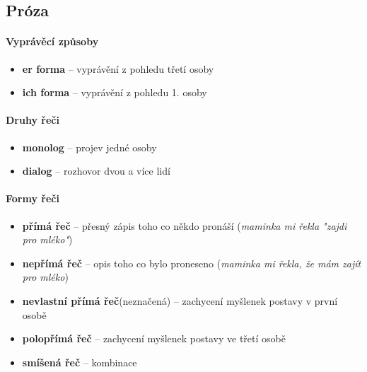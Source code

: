 \documentclass[10pt,a4paper]{article}
\begin{document}
\subsection{Próza}
\paragraph{Vyprávěcí způsoby}
\begin{itemize}
\item[] \textbf{er forma} -- vyprávění z pohledu třetí osoby
\item[] \textbf{ich forma} -- vyprávění z pohledu 1. osoby
\end{itemize}

\paragraph{Druhy řeči}
\begin{itemize}
\item[] \textbf{monolog} -- projev jedné osoby
\item[] \textbf{dialog} -- rozhovor dvou a více lidí
\end{itemize}

\paragraph{Formy řeči}
\begin{itemize}
\item[] \textbf{přímá řeč} -- přesný zápis toho co někdo pronáší (\textit{maminka mi řekla "zajdi pro mléko"})
\item[] \textbf{nepřímá řeč} -- opis toho co bylo proneseno (\textit{maminka mi řekla, že mám zajít pro mléko})
\item[] \textbf{nevlastní přímá řeč}(neznačená) -- zachycení myšlenek postavy v první osobě
\item[] \textbf{polopřímá řeč} -- zachycení myšlenek postavy ve třetí osobě
\item[] \textbf{smíšená řeč} -- kombinace
\end{itemize}
\end{document}
